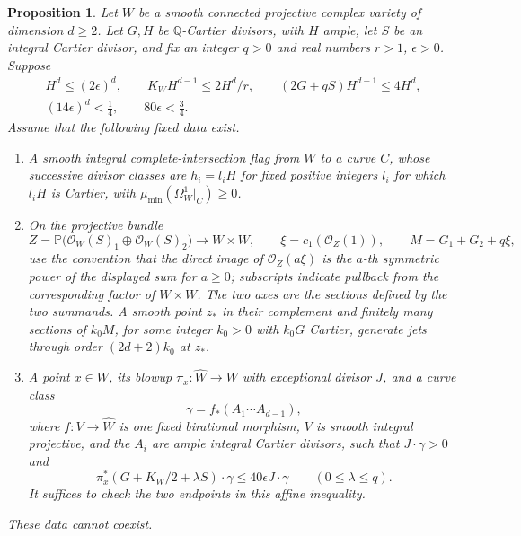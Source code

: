 \documentclass[12pt,a4paper,psamsfonts]{amsart}
\theoremstyle{definition}
\theoremstyle{plain}
\newtheorem{proposition}[lemma]{Proposition}
\newcommand{\PP}{\mathbb P}
\begin{document}
\begin{proposition}
\label{thm:finite-data}
Let $W$ be a smooth connected projective complex variety of
dimension $d\ge2$. Let $G,H$ be $\mathbb{Q}$-Cartier divisors, with
$H$ ample, let $S$ be an integral Cartier divisor, and fix an
integer $q>0$ and real numbers $r>1$, $\epsilon>0$. Suppose
\begin{equation}\label{fr:intersection-bounds}
 \begin{gathered}
 H^d\le(2\epsilon)^d,\qquad
 K_WH^{d-1}\le2H^d/r,\qquad
 (2G+qS)H^{d-1}\le4H^d,\\
 (14\epsilon)^d<\tfrac14,\qquad 80\epsilon<\tfrac34.
 \end{gathered}
\end{equation}
Assume that the following fixed data exist.
\begin{enumerate}
\renewcommand{\labelenumi}{\textup{(\roman{enumi})}}
\item A smooth integral complete-intersection flag from $W$ to
a curve $C$, whose successive divisor classes are $h_i=l_iH$
for fixed positive integers $l_i$ for which $l_iH$ is Cartier, with
$\mu_{\min}(\Omega_W^1|_C)\ge0$.
\item On the projective bundle
\[
 Z=\PP\bigl(\mathcal O_W(S)_1\oplus
                         \mathcal O_W(S)_2\bigr)\longrightarrow W\times W,
 \qquad \xi=c_1(\mathcal O_Z(1)),\qquad M=G_1+G_2+q\xi,
\]
use the convention that the direct image of $\mathcal O_Z(a\xi)$
is the $a$-th symmetric power of the displayed sum for $a\ge0$;
subscripts indicate pullback from the corresponding factor of
$W\times W$. The two axes are the sections defined by the two
summands. A smooth point $z_*$ in their complement and finitely many
sections of $k_0M$, for some integer $k_0>0$ with $k_0G$ Cartier,
generate jets through order $(2d+2)k_0$ at $z_*$.
\item A point $x\in W$, its blowup
$\pi_x:\widehat W\to W$ with exceptional divisor $J$, and a
curve class
\[
 \gamma=f_*(A_1\cdots A_{d-1}),
\]
where $f:V\to\widehat W$ is one fixed birational morphism,
$V$ is smooth integral projective, and the $A_i$ are ample
integral Cartier divisors, such that $J\cdot\gamma>0$ and
\begin{equation}\label{fr:movable-input}
 \pi_x^*(G+K_W/2+\lambda S)\cdot\gamma
 \le40\epsilon J\cdot\gamma\qquad(0\le\lambda\le q).
\end{equation}
It suffices to check the two endpoints in this affine inequality.
\end{enumerate}
These data cannot coexist.
\end{proposition}
\end{document}
